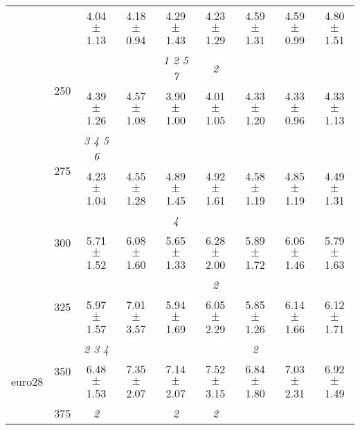 \begin{table}[h]
{\begin{tabular}{
        ccccccccc}
 & & \cellcolor[HTML]{EFEFEF} 4.04 $\pm$ 1.13& \cellcolor[HTML]{EFEFEF} 4.18 $\pm$ 0.94& \cellcolor[HTML]{EFEFEF} 4.29 $\pm$ 1.43& \cellcolor[HTML]{EFEFEF} 4.23 $\pm$ 1.29& \cellcolor[HTML]{EFEFEF} 4.59 $\pm$ 1.31& \cellcolor[HTML]{EFEFEF} 4.59 $\pm$ 0.99& \cellcolor[HTML]{EFEFEF} 4.80 $\pm$ 1.51 \\ 
 & \multirow{2}{*}{250}& & & \textit{ 1 2 5 7 }& \textit{ 2 }& & &  \\ 
 & & 4.39 $\pm$ 1.26& 4.57 $\pm$ 1.08& 3.90 $\pm$ 1.00& 4.01 $\pm$ 1.05& 4.33 $\pm$ 1.20& 4.33 $\pm$ 0.96& 4.33 $\pm$ 1.13 \\ 
 & \multirow{2}{*}{275}& \cellcolor[HTML]{EFEFEF} \textit{ 3 4 5 6 }& \cellcolor[HTML]{EFEFEF} & \cellcolor[HTML]{EFEFEF} & \cellcolor[HTML]{EFEFEF} & \cellcolor[HTML]{EFEFEF} & \cellcolor[HTML]{EFEFEF} & \cellcolor[HTML]{EFEFEF}  \\ 
 & & \cellcolor[HTML]{EFEFEF} 4.23 $\pm$ 1.04& \cellcolor[HTML]{EFEFEF} 4.55 $\pm$ 1.28& \cellcolor[HTML]{EFEFEF} 4.89 $\pm$ 1.45& \cellcolor[HTML]{EFEFEF} 4.92 $\pm$ 1.61& \cellcolor[HTML]{EFEFEF} 4.58 $\pm$ 1.19& \cellcolor[HTML]{EFEFEF} 4.85 $\pm$ 1.19& \cellcolor[HTML]{EFEFEF} 4.49 $\pm$ 1.31 \\ 
 & \multirow{2}{*}{300}& & & \textit{ 4 }& & & &  \\ 
 & & 5.71 $\pm$ 1.52& 6.08 $\pm$ 1.60& 5.65 $\pm$ 1.33& 6.28 $\pm$ 2.00& 5.89 $\pm$ 1.72& 6.06 $\pm$ 1.46& 5.79 $\pm$ 1.63 \\ 
 & \multirow{2}{*}{325}& \cellcolor[HTML]{EFEFEF} & \cellcolor[HTML]{EFEFEF} & \cellcolor[HTML]{EFEFEF} & \cellcolor[HTML]{EFEFEF} \textit{ 2 }& \cellcolor[HTML]{EFEFEF} & \cellcolor[HTML]{EFEFEF} & \cellcolor[HTML]{EFEFEF}  \\ 
 & & \cellcolor[HTML]{EFEFEF} 5.97 $\pm$ 1.57& \cellcolor[HTML]{EFEFEF} 7.01 $\pm$ 3.57& \cellcolor[HTML]{EFEFEF} 5.94 $\pm$ 1.69& \cellcolor[HTML]{EFEFEF} 6.05 $\pm$ 2.29& \cellcolor[HTML]{EFEFEF} 5.85 $\pm$ 1.26& \cellcolor[HTML]{EFEFEF} 6.14 $\pm$ 1.66& \cellcolor[HTML]{EFEFEF} 6.12 $\pm$ 1.71 \\ 
 \multirow{4}{*}{euro28} & \multirow{2}{*}{350}& \textit{ 2 3 4 }& & & & \textit{ 2 }& &  \\ 
 & & 6.48 $\pm$ 1.53& 7.35 $\pm$ 2.07& 7.14 $\pm$ 2.07& 7.52 $\pm$ 3.15& 6.84 $\pm$ 1.80& 7.03 $\pm$ 2.31& 6.92 $\pm$ 1.49 \\ 
 & \multirow{2}{*}{375}& \cellcolor[HTML]{EFEFEF} \textit{ 2 }& \cellcolor[HTML]{EFEFEF} & \cellcolor[HTML]{EFEFEF} \textit{ 2 }& \cellcolor[HTML]{EFEFEF} \textit{ 2 }& \cellcolor[HTML]{EFEFEF} & \cellcolor[HTML]{EFEFEF} & \cellcolor[HTML]{EFEFEF}  \\ 

\end{tabular}}
\end{table}
